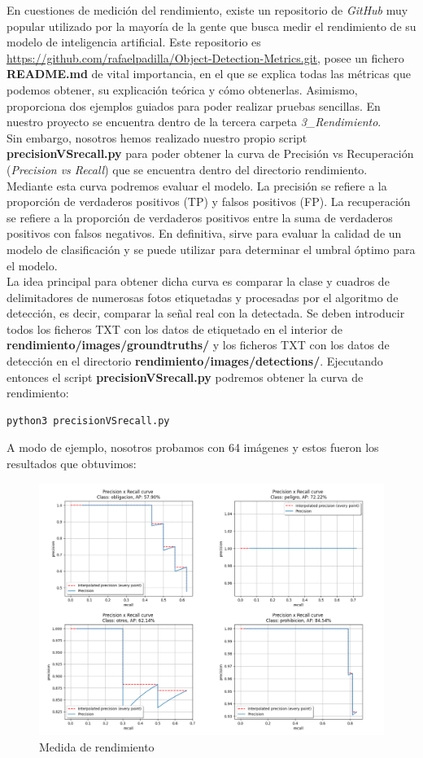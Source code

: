 En cuestiones de medición del rendimiento, existe un repositorio de \textit{GitHub} muy popular utilizado por la mayoría de la gente que busca medir el rendimiento de su modelo de inteligencia artificial. Este repositorio es \url{https://github.com/rafaelpadilla/Object-Detection-Metrics.git}, posee un fichero \textbf{README.md} de vital importancia, en el que se explica todas las métricas que podemos obtener, su explicación teórica y cómo obtenerlas. Asimismo, proporciona dos ejemplos guiados para poder realizar pruebas sencillas. En nuestro proyecto se encuentra dentro de la tercera carpeta \textit{3_Rendimiento}.\\

Sin embargo, nosotros hemos realizado nuestro propio script \textbf{precisionVSrecall.py} para poder obtener la curva de Precisión vs Recuperación (\textit{Precision vs Recall}) que se encuentra dentro del directorio rendimiento. Mediante esta curva podremos evaluar el modelo. La precisión se refiere a la proporción de verdaderos positivos (TP) y falsos positivos (FP). La recuperación se refiere a la proporción de verdaderos positivos entre la suma de verdaderos positivos con falsos negativos. En definitiva, sirve para evaluar la calidad de un modelo de clasificación y se puede utilizar para determinar el umbral óptimo para el modelo.\\

La idea principal para obtener dicha curva es comparar la clase y cuadros de delimitadores de numerosas fotos etiquetadas y procesadas por el algoritmo de detección, es decir, comparar la señal real con la detectada. Se deben introducir todos los ficheros TXT con los datos de etiquetado en el interior de \textbf{rendimiento/images/groundtruths/} y los ficheros TXT con los datos de detección en el directorio \textbf{rendimiento/images/detections/}. Ejecutando entonces el script \textbf{precisionVSrecall.py} podremos obtener la curva de rendimiento:
\begin{lstlisting}
python3 precisionVSrecall.py
\end{lstlisting}

A modo de ejemplo, nosotros probamos con 64 imágenes y estos fueron los resultados que obtuvimos:

\begin{figure}[H]
	\centering
	\includegraphics[width=\textwidth]{Imagenes/AnexoI_Manual/AA/rendimiento.pdf}
	\caption{Medida de rendimiento}
	\label{rendimiento2}
\end{figure}


